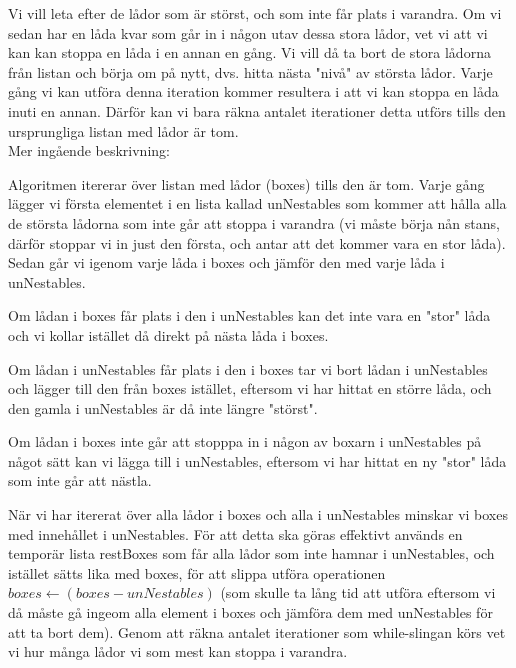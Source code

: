 \documentclass[a4paper]{article}
\begin{document}
Vi vill leta efter de lådor som är störst, och som inte får plats i varandra. Om vi sedan har en låda kvar som går in i någon utav dessa stora lådor, vet vi att vi kan kan stoppa en låda i en annan en gång. Vi vill då ta bort de stora lådorna från listan och börja om på nytt, dvs. hitta nästa "nivå" av största lådor. Varje gång vi kan utföra denna iteration kommer resultera i att vi kan stoppa en låda inuti en annan. Därför kan vi bara räkna antalet iterationer detta utförs tills den ursprungliga listan med lådor är tom. \\ \newline Mer ingående beskrivning: \newline

Algoritmen itererar över listan med lådor (boxes) tills den är tom. Varje gång lägger vi första elementet i en lista kallad unNestables som kommer att hålla alla de största lådorna som inte går att stoppa i varandra (vi måste börja nån stans, därför stoppar vi in just den första, och antar att det kommer vara en stor låda). Sedan går vi igenom varje låda i boxes och jämför den med varje låda i unNestables.

Om lådan i boxes får plats i den i unNestables kan det inte vara en "stor" låda och vi kollar istället då direkt på nästa låda i boxes.

Om lådan i unNestables får plats i den i boxes tar vi bort lådan i unNestables och lägger till den från boxes istället, eftersom vi har hittat en större låda, och den gamla i unNestables är då inte längre "störst".

Om lådan i boxes inte går att stopppa in i någon av boxarn i unNestables på något sätt kan vi lägga till i unNestables, eftersom vi har hittat en ny "stor" låda som inte går att nästla.

När vi har itererat över alla lådor i boxes och alla i unNestables minskar vi boxes med innehållet i unNestables. För att detta ska göras effektivt används en temporär lista restBoxes som får alla lådor som inte hamnar i unNestables, och istället sätts lika med boxes, för att slippa utföra operationen $boxes \leftarrow (boxes - unNestables)$ (som skulle ta lång tid att utföra eftersom vi då måste gå ingeom alla element i boxes och jämföra dem med unNestables för att ta bort dem). Genom att räkna antalet iterationer som while-slingan körs vet vi hur många lådor vi som mest kan stoppa i varandra.
\end{document}
